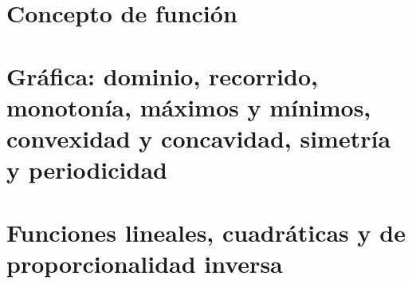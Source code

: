 
\section{Concepto de función}



\section{Gráfica: dominio, recorrido, monotonía, máximos y mínimos, convexidad y concavidad, simetría y periodicidad}



\section{Funciones lineales, cuadráticas y de proporcionalidad inversa}




